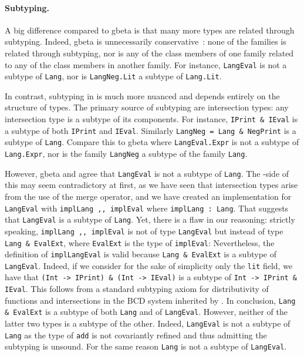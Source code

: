\paragraph{Subtyping.}
A big difference compared to \textsf{gbeta} is that many more \namee types are related through
subtyping. Indeed, \textsf{gbeta} is unnecessarily conservative~\citep{ernst_hoh}: none of the families is related
through subtyping, nor is any of the class members of one family related to any
of the class members in another family. For instance, \lstinline{LangEval} is
not a subtype of \lstinline{Lang}, nor is \lstinline{LangNeg.Lit} a subtype
of \lstinline{Lang.Lit}.

In contrast, subtyping in \namee is much more nuanced and depends entirely on the
structure of types. The primary source of subtyping are intersection types:
any intersection type is a subtype of its components. For instance, 
\lstinline{IPrint & IEval} is a subtype of both \lstinline{IPrint} and
\lstinline{IEval}. Similarly \lstinline{LangNeg = Lang & NegPrint} is a subtype
of \lstinline{Lang}. Compare this to \textsf{gbeta} where \lstinline{LangEval.Expr} is
not a subtype of \lstinline{Lang.Expr}, nor is the family \lstinline{LangNeg} a
subtype of the family \lstinline{Lang}.

However, \textsf{gbeta} and \namee agree that \lstinline{LangEval} is not a subtype of
\lstinline{Lang}. The \namee-side of this may seem contradictory at first, as we
have seen that intersection types arise from the use of the merge operator, and
we have created an implementation for \lstinline{LangEval} with
\lstinline{implLang ,, implEval} where \lstinline{implLang : Lang}. That
suggests that \lstinline{LangEval} is a subtype of \lstinline{Lang}.
Yet, there is a flaw in our reasoning:
strictly speaking, \lstinline{implLang ,, implEval} is not of
type \lstinline{LangEval} but instead of type \lstinline{Lang & EvalExt}, where
\lstinline{EvalExt} is the type of \lstinline{implEval}:
Nevertheless, the definition of \lstinline{implLangEval} is valid because
\lstinline{Lang & EvalExt} is a subtype of \lstinline{LangEval}.
Indeed, if we consider for the sake of simplicity only the \lstinline{lit}
field, we have that \lstinline{(Int -> IPrint) & (Int -> IEval)} is a
subtype of \lstinline{Int -> IPrint & IEval}. This follows from a standard
subtyping axiom for distributivity of functions and intersections in the BCD system inherited by \namee.
In conclusion, \lstinline{Lang & EvalExt} is a subtype of both \lstinline{Lang}
and of \lstinline{LangEval}. However, neither of the latter two types is a subtype of the other.
Indeed, \lstinline{LangEval} is not a subtype of \lstinline{Lang} as the type
of \lstinline{add} is not covariantly refined and thus admitting the subtyping
is unsound. For the same reason \lstinline{Lang} is not a subtype of \lstinline{LangEval}.


